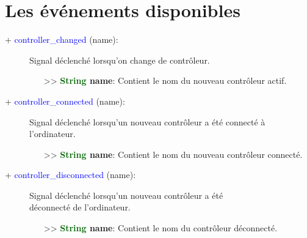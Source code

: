 \documentclass[a4paper, 11pt]{article}
\begin{document}
	\section{Les événements disponibles}
	\begin{description}
		\item [+ \textcolor{blue}{controller\_changed} (name):] Signal déclenché lorsqu'on change de 
		contrôleur.
		\begin{itemize}
			\item [>> \textbf{\textcolor{darkgreen}{String} name}:] Contient le nom du nouveau contrôleur
			actif.\\
		\end{itemize}
	\end{description}
	\begin{description}
		\item [+ \textcolor{blue}{controller\_connected} (name):] Signal déclenché lorsqu'un nouveau 
		contrôleur a été connecté à l'ordinateur.
		\begin{itemize}
			\item [>> \textbf{\textcolor{darkgreen}{String} name}:] Contient le nom du nouveau contrôleur
			connecté.\\
		\end{itemize}
	\end{description}
	\begin{description}
		\item [+ \textcolor{blue}{controller\_disconnected} (name):] Signal déclenché lorsqu'un nouveau 
		contrôleur a été \\déconnecté de l'ordinateur.
		\begin{itemize}
			\item [>> \textbf{\textcolor{darkgreen}{String} name}:] Contient le nom du contrôleur 
			déconnecté.\\
		\end{itemize}
	\end{description}
\end{document}
